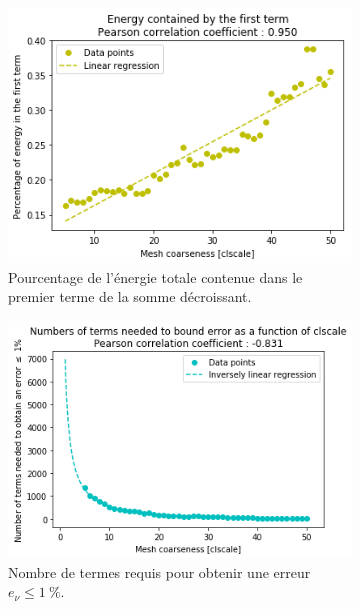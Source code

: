 \documentclass[11pt]{article}
\begin{document}
\begin{figure}[H]
	\centering
	\begin{subfigure}[t]{0.32\textwidth}
		\centering
		\includegraphics[width=\linewidth]{clscalefirst.png}
		\caption{Pourcentage de l'énergie totale contenue dans le premier terme de la somme décroissant.}
		\label{fig:clscalefirst}
	\end{subfigure}\hfill
	\begin{subfigure}[t]{0.32\textwidth}
		\centering
		\includegraphics[width=\linewidth]{clscale1.png}
		\caption{Nombre de termes requis pour obtenir une erreur $e_{\nu} \le \SI{1}{\percent}$.}
		\label{fig:clscale1}
	\end{subfigure}\hfill
	\begin{subfigure}[t]{0.32\textwidth}
		\centering

\end{subfigure}
\end{figure}
\end{document}
